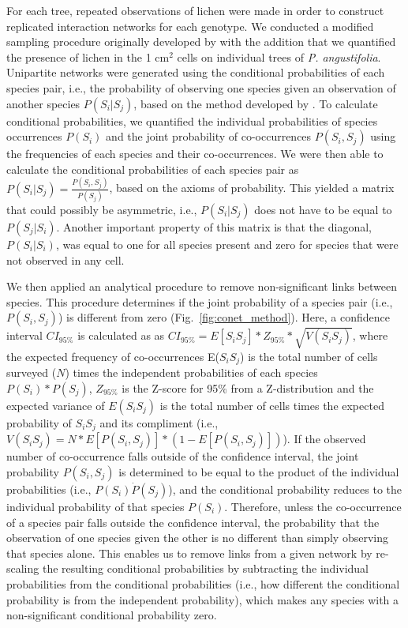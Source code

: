 \documentclass[fleqn,12pt]{olplainarticle}
\begin{document}
For each tree, repeated observations of lichen were made in order to
construct replicated interaction networks for each genotype. We
conducted a modified sampling procedure originally developed by
\cite{Lamit2015a} with the addition that we quantified the presence
of lichen in the 1 cm$^2$ cells on individual trees of
\textit{P. angustifolia}. Unipartite networks were generated using the
conditional probabilities of each species pair, i.e., the probability
of observing one species given an observation of another species
$P(S_i | S_j)$, based on the method developed by
\cite{Araujo2011}. To calculate conditional probabilities, we
quantified the individual probabilities of species occurrences
$P(S_i)$ and the joint probability of co-occurrences $P(S_i, S_j)$
using the frequencies of each species and their co-occurrences. We
were then able to calculate the conditional probabilities of each
species pair as $P(S_i|S_j) = \frac{P(S_i,S_j)}{P(S_j)}$, based on the
axioms of probability. This yielded a matrix that could possibly be
asymmetric, i.e., $P(S_i|S_j)$ does not have to be equal to
$P(S_j|S_i)$. Another important property of this matrix is that the
diagonal, $P(S_{i} | S_{i})$, was equal to one for all species present
and zero for species that were not observed in any cell.

We then applied an analytical procedure to remove non-significant
links between species. This procedure determines if the joint
probability of a species pair (i.e., $P(S_i,S_j)$) is different from
zero (Fig.~\ref{fig:conet_method}).  Here, a confidence interval
$CI_{95\%}$ is calculated as as $CI_{95\%} = E[S_iS_j] * Z_{95\%} *
\sqrt{V(S_iS_j)}$, where the expected frequency of co-occurrences
E($S_iS_j$) is the total number of cells surveyed ($N$) times the
independent probabilities of each species $P(S_i) * P(S_j)$,
$Z_{95\%}$ is the Z-score for 95\% from a Z-distribution and the
expected variance of $E(S_iS_j)$ is the total number of cells times
the expected probability of $S_iS_j$ and its compliment
(i.e., $V(S_iS_j) = N * E[P(S_i,S_j)] * (1 - E[P(S_i,S_j)])$). If the
observed number of co-occurrence falls outside of the confidence
interval, the joint probability $P(S_i,S_j)$ is determined to be equal
to the product of the individual probabilities (i.e., $P(S_i) \dot
P(S_j)$), and the conditional probability reduces to the individual
probability of that species $P(S_i)$. Therefore, unless the
co-occurrence of a species pair falls outside the confidence interval,
the probability that the observation of one species given the other is
no different than simply observing that species alone. This enables us
to remove links from a given network by re-scaling the resulting
conditional probabilities by subtracting the individual probabilities
from the conditional probabilities (i.e., how different the conditional
probability is from the independent probability), which makes any
species with a non-significant conditional probability zero. 
\end{document}
